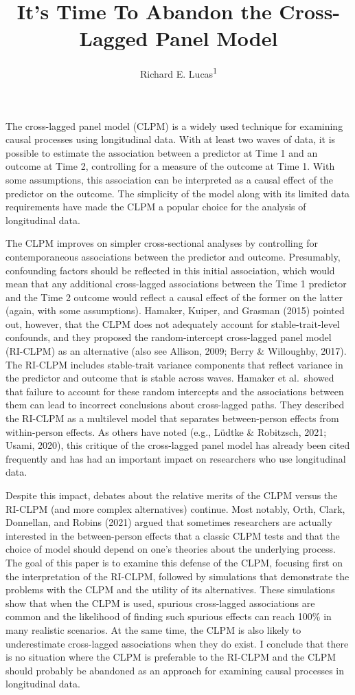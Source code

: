 \documentclass[
  english,
  man,floatsintext]{apa6}
\title{It's Time To Abandon the Cross-Lagged Panel Model}
\author{Richard E. Lucas\textsuperscript{1}}
\date{}
\affiliation{\vspace{0.5cm}\textsuperscript{1} Department of Psychology, Michigan State University}
\begin{document}
\maketitle

The cross-lagged panel model (CLPM) is a widely used technique for examining causal processes using longitudinal data. With at least two waves of data, it is possible to estimate the association between a predictor at Time 1 and an outcome at Time 2, controlling for a measure of the outcome at Time 1. With some assumptions, this association can be interpreted as a causal effect of the predictor on the outcome. The simplicity of the model along with its limited data requirements have made the CLPM a popular choice for the analysis of longitudinal data.

The CLPM improves on simpler cross-sectional analyses by controlling for contemporaneous associations between the predictor and outcome. Presumably, confounding factors should be reflected in this initial association, which would mean that any additional cross-lagged associations between the Time 1 predictor and the Time 2 outcome would reflect a causal effect of the former on the latter (again, with some assumptions). Hamaker, Kuiper, and Grasman (2015) pointed out, however, that the CLPM does not adequately account for stable-trait-level confounds, and they proposed the random-intercept cross-lagged panel model (RI-CLPM) as an alternative (also see Allison, 2009; Berry \& Willoughby, 2017). The RI-CLPM includes stable-trait variance components that reflect variance in the predictor and outcome that is stable across waves. Hamaker et al.~showed that failure to account for these random intercepts and the associations between them can lead to incorrect conclusions about cross-lagged paths. They described the RI-CLPM as a multilevel model that separates between-person effects from within-person effects. As others have noted (e.g., Lüdtke \& Robitzsch, 2021; Usami, 2020), this critique of the cross-lagged panel model has already been cited frequently and has had an important impact on researchers who use longitudinal data.

Despite this impact, debates about the relative merits of the CLPM versus the RI-CLPM (and more complex alternatives) continue. Most notably, Orth, Clark, Donnellan, and Robins (2021) argued that sometimes researchers are actually interested in the between-person effects that a classic CLPM tests and that the choice of model should depend on one's theories about the underlying process. The goal of this paper is to examine this defense of the CLPM, focusing first on the interpretation of the RI-CLPM, followed by simulations that demonstrate the problems with the CLPM and the utility of its alternatives. These simulations show that when the CLPM is used, spurious cross-lagged associations are common and the likelihood of finding such spurious effects can reach 100\% in many realistic scenarios. At the same time, the CLPM is also likely to underestimate cross-lagged associations when they do exist. I conclude that there is no situation where the CLPM is preferable to the RI-CLPM and the CLPM should probably be abandoned as an approach for examining causal processes in longitudinal data.
\end{document}
